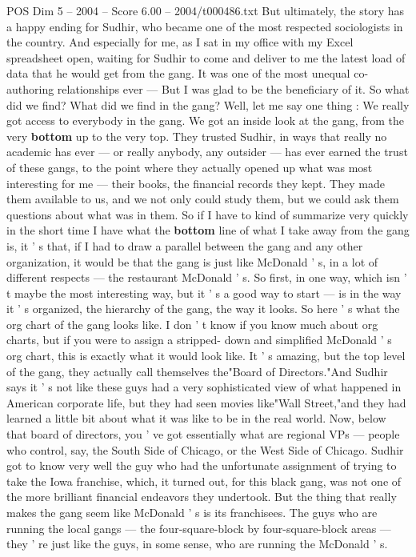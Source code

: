 \begin{textsample}{POS Dim 5 – 2004 – Score 6.00 – 2004/t000486.txt}
But ultimately, the story has a happy ending for Sudhir, who became one of the most respected sociologists in the country.
And especially for me, as I sat in my office with my Excel spreadsheet open, waiting for Sudhir to come and deliver to me the latest load of data that he would get from the gang.
It was one of the most unequal co-authoring relationships ever — But I was glad to be the beneficiary of it.
So what did we find?
What did we find in the gang?
Well, let me say one thing : We really got access to everybody in the gang.
We got an inside look at the gang, from the very \textbf{bottom} up to the very top.
They trusted Sudhir, in ways that really no academic has ever — or really anybody, any outsider — has ever earned the trust of these gangs, to the point where they actually opened up what was most interesting for me — their books, the financial records they kept.
They made them available to us, and we not only could study them, but we could ask them questions about what was in them.
So if I have to kind of summarize very quickly in the short time I have what the \textbf{bottom} line of what I take away from the gang is, it ' s that, if I had to draw a parallel between the gang and any other organization, it would be that the gang is just like McDonald ' s, in a lot of different respects — the restaurant McDonald ' s.
So first, in one way, which isn ' t maybe the most interesting way, but it ' s a good way to start — is in the way it ' s organized, the hierarchy of the gang, the way it looks.
So here ' s what the org chart of the gang looks like.
I don ' t know if you know much about org charts, but if you were to assign a stripped- down and simplified McDonald ' s org chart, this is exactly what it would look like.
It ' s amazing, but the top level of the gang, they actually call themselves the"Board of Directors."And Sudhir says it ' s not like these guys had a very sophisticated view of what happened in American corporate life, but they had seen movies like"Wall Street,"and they had learned a little bit about what it was like to be in the real world.
Now, below that board of directors, you ' ve got essentially what are regional VPs — people who control, say, the South Side of Chicago, or the West Side of Chicago.
Sudhir got to know very well the guy who had the unfortunate assignment of trying to take the Iowa franchise, which, it turned out, for this black gang, was not one of the more brilliant financial endeavors they undertook.
But the thing that really makes the gang seem like McDonald ' s is its franchisees.
The guys who are running the local gangs — the four-square-block by four-square-block areas — they ' re just like the guys, in some sense, who are running the McDonald ' s.

\end{textsample}
